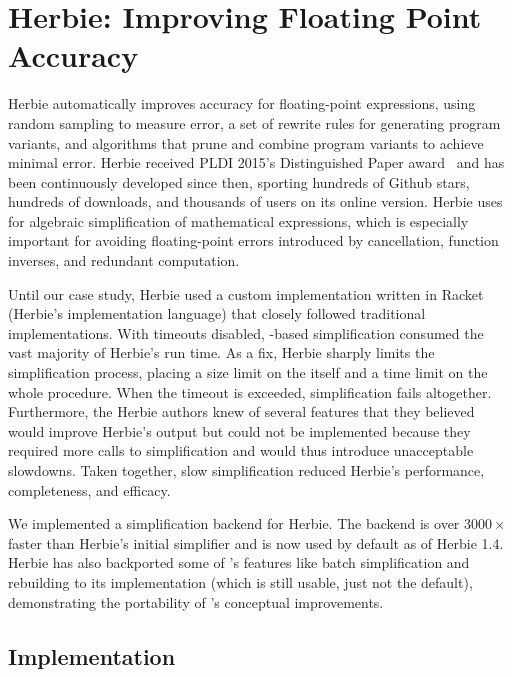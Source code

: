 \section{Herbie: Improving Floating Point Accuracy}
\label{sec:herbie}

Herbie automatically improves accuracy
  for floating-point expressions,
  using random sampling to measure error,
  a set of rewrite rules for generating program variants,
  and algorithms that prune and combine program variants
  to achieve minimal error.
Herbie received PLDI 2015's Distinguished Paper award~\cite{herbie}
  and has been continuously developed since then,
  sporting hundreds of Github stars, hundreds of downloads,
  and thousands of users on its online version.
Herbie uses \egraphs for algebraic simplification of mathematical expressions,
  which is especially important for avoiding floating-point errors
  introduced by cancellation, function inverses, and redundant computation.

Until our case study,
  Herbie used a custom \egraph implementation
  written in Racket (Herbie's implementation language)
  that closely followed traditional \egraph implementations.
With timeouts disabled,
  \egraph-based simplification consumed
  the vast majority of Herbie's run time.
As a fix, Herbie sharply limits the simplification process,
  placing a size limit on the \egraph itself and a time limit on the whole
  procedure.
When the timeout is exceeded, simplification fails altogether.
Furthermore, the Herbie authors knew of several features
  that they believed would improve Herbie's output
  but could not be implemented because
  they required more calls to simplification
  and would thus introduce unacceptable slowdowns.
Taken together, slow simplification reduced Herbie's performance, completeness,
  and efficacy.

We implemented a \egg simplification backend for Herbie.
The \egg backend is over $3000\times$ faster than Herbie's initial simplifier and
  is now used by default as of Herbie 1.4.
Herbie has also backported some of \egg's features like batch simplification and
  rebuilding to its \egraph implementation
  (which is still usable, just not the default),
  demonstrating the portability of \egg's conceptual improvements.

\subsection{Implementation}

